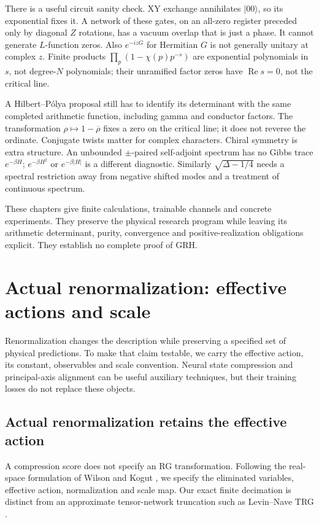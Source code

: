 \documentclass[11pt,oneside,openany]{book}
\theoremstyle{definition}\newtheorem{definition}[theorem]{Definition}
\theoremstyle{remark}\newtheorem{remark}[theorem]{Remark}
\begin{document}
There is a useful circuit sanity check. XY exchange annihilates $|00\rangle$,
so its exponential fixes it. A network of these gates, on an all-zero
register preceded only by diagonal $Z$ rotations, has a vacuum overlap
that is just a phase. It cannot generate $L$-function zeros. Also
$e^{-izG}$ for Hermitian $G$ is not generally unitary at complex $z$.
Finite products $\prod_p(1-\chi(p)p^{-s})$ are exponential polynomials
in $s$, not degree-$N$ polynomials; their unramified factor zeros have
$\operatorname{Re}s=0$, not the critical line.

A Hilbert--P\'olya proposal still has to identify its determinant with the
same completed arithmetic function, including gamma and conductor factors.
The transformation $\rho\mapsto1-\overline\rho$ fixes a zero on the
critical line; it does not reverse the ordinate. Conjugate twists matter
for complex characters. Chiral symmetry is extra structure. An unbounded
$\pm$-paired self-adjoint spectrum has no Gibbs trace $e^{-\beta H}$;
$e^{-\beta H^2}$ or $e^{-\beta|H|}$ is a different diagnostic. Similarly
$\sqrt{\Delta-1/4}$ needs a spectral restriction away from negative shifted
modes and a treatment of continuous spectrum.

These chapters give finite calculations, trainable channels and concrete
experiments. They preserve the physical research program while leaving
its arithmetic determinant, purity, convergence and positive-realization
obligations explicit. They establish no complete proof of GRH.

\chapter{Actual renormalization: effective actions and scale}
\label{rg:chapter}
Renormalization changes the description while preserving a specified set of
physical predictions. To make that claim testable, we carry the effective
action, its constant, observables and scale convention. Neural state
compression and principal-axis alignment can be useful auxiliary techniques,
but their training losses do not replace these objects.
\section{Actual renormalization retains the effective action}
\label{sec:actual-rg}
A compression score does not specify an RG transformation. Following the
real-space formulation of Wilson and Kogut \cite{WilsonKogutRG}, we specify
the eliminated variables, effective action, normalization and scale map.
Our exact finite decimation is distinct from an approximate tensor-network
truncation such as Levin--Nave TRG \cite{LevinNaveRG}.
\end{document}
